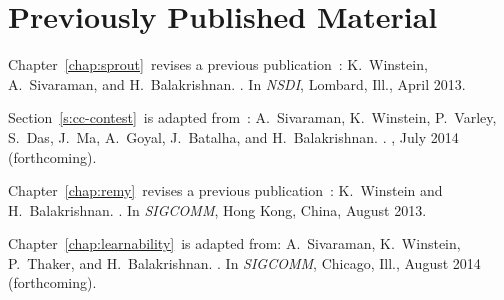 \chapter*{Previously Published Material}
%

{
\setlength{\parindent}{0 pt}
\setlength{\parskip}{\baselineskip}

Chapter~\ref{chap:sprout}~revises a previous
publication~\cite{sprout}:
K.~Winstein, A.~Sivaraman, and H.~Balakrishnan.
.
\newblock In {\em NSDI}, Lombard, Ill., April 2013.

Section~\ref{s:cc-contest}~is adapted
from~\cite{cc-contest}: A.~Sivaraman, K.~Winstein, P.~Varley, S.~Das,
J.~Ma, A.~Goyal, J.~Batalha, and H.~Balakrishnan.  .  , July 2014 (forthcoming).

Chapter~\ref{chap:remy}~revises a previous publication~\cite{remy}:
K.~Winstein and H.~Balakrishnan.
.
\newblock In {\em SIGCOMM}, Hong Kong, China, August 2013.

Chapter~\ref{chap:learnability}~is adapted from:
A.~Sivaraman, K.~Winstein, P.~Thaker, and H.~Balakrishnan.
. \newblock In {\em
  SIGCOMM}, Chicago, Ill., August 2014 (forthcoming).

}
